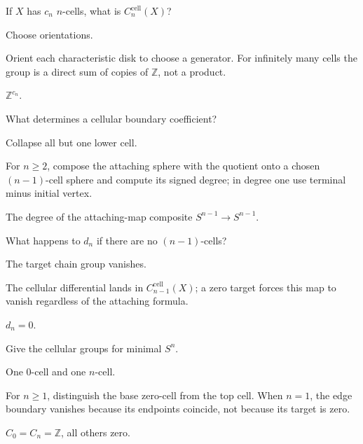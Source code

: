 \begin{exercise}\label{exr:viii18-02}
If \(X\) has \(c_n\) \(n\)-cells, what is \(C_n^{\mathrm{cell}}(X)\)?
\end{exercise}
\begin{hint}
Choose orientations.

Orient each characteristic disk to choose a generator. For infinitely many cells the group is a direct sum of copies of \(\mathbb Z\), not a product.
\end{hint}
\begin{solution}
\(\mathbb Z^{c_n}\).
\end{solution}

\begin{exercise}\label{exr:viii18-03}
What determines a cellular boundary coefficient?
\end{exercise}
\begin{hint}
Collapse all but one lower cell.

For \(n\ge2\), compose the attaching sphere with the quotient onto a chosen \((n-1)\)-cell sphere and compute its signed degree; in degree one use terminal minus initial vertex.
\end{hint}
\begin{solution}
The degree of the attaching-map composite \(S^{n-1}\to S^{n-1}\).
\end{solution}

\begin{exercise}\label{exr:viii18-04}
What happens to \(d_n\) if there are no \((n-1)\)-cells?
\end{exercise}
\begin{hint}
The target chain group vanishes.

The cellular differential lands in \(C_{n-1}^{\mathrm{cell}}(X)\); a zero target forces this map to vanish regardless of the attaching formula.
\end{hint}
\begin{solution}
\(d_n=0\).
\end{solution}

\begin{exercise}\label{exr:viii18-05}
Give the cellular groups for minimal \(S^n\).
\end{exercise}
\begin{hint}
One 0-cell and one \(n\)-cell.

For \(n\ge1\), distinguish the base zero-cell from the top cell. When \(n=1\), the edge boundary vanishes because its endpoints coincide, not because its target is zero.
\end{hint}
\begin{solution}
\(C_0=C_n=\mathbb Z\), all others zero.
\end{solution}

